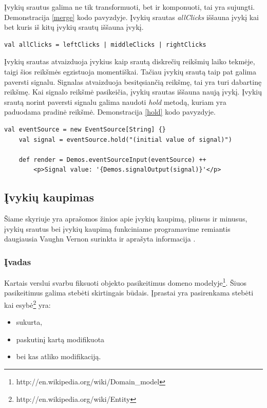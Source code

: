 Įvykių srautus galima ne tik transformuoti, bet ir komponuoti, tai yra sujungti. Demonstracija \ref{merge} kodo pavyzdyje. Įvykių srautas \textit{allClicks} iššauna įvykį kai bet kuris iš kitų įvykių srautų iššauna įvykį.

\begin{lstlisting}[caption=- įvykių srautų sujungimas, label=merge]
	val allClicks = leftClicks | middleClicks | rightClicks
\end{lstlisting}

Įvykių srautas atvaizduoja įvykius kaip srautą diskrečių reikšmių laiko tekmėje, taigi šios reikšmės egzistuoja momentiškai. Tačiau įvykių srautą taip pat galima paversti signalu. Signalas atvaizduoja besitęsiančią reikšmę, tai yra turi dabartinę reikšmę. Kai signalo reikšmė pasikeičia, įvykių srautas iššauna naują įvykį. Įvykių srautą norint paversti signalu galima naudoti \textit{hold} metodą, kuriam yra paduodama pradinė reikšmė. Demonstracija \ref{hold} kodo pavyzdyje.

\begin{lstlisting}[caption=- įvykių srautų pavertimas signalu, label=hold]
	val eventSource = new EventSource[String] {}
  	val signal = eventSource.hold("(initial value of signal)")
  
  	def render = Demos.eventSourceInput(eventSource) ++
    	<p>Signal value: '{Demos.signalOutput(signal)}'</p>
\end{lstlisting}

\subsection{Įvykių kaupimas}

Šiame skyriuje yra aprašomos žinios apie įvykių kaupimą, pliusus ir minusus, įvykių srautus bei įvykių kaupimą funkciniame programavime remiantis daugiausia Vaughn Vernon surinkta ir aprašyta informacija \cite{vernon2013implementing}.

\subsubsection{Įvadas}

Kartais verslui svarbu fiksuoti objekto pasikeitimus domeno modelyje\footnote{http://en.wikipedia.org/wiki/Domain\_model}. Šiuos pasikeitimus galima stebėti skirtingais būdais. Įprastai yra pasirenkama stebėti kai esybė\footnote{http://en.wikipedia.org/wiki/Entity} yra:

\begin{itemize}

	\item sukurta,

	\item paskutinį kartą modifikuota

	\item bei kas atliko modifikaciją.

\end{itemize}

